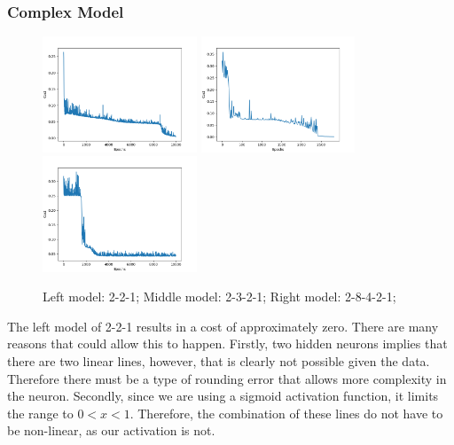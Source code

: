 \subsubsection{Complex Model}
\label{rescomp}
\begin{figure}[H]

\includegraphics[width=4.6cm]{images/parameters/complex/line-.png}
\includegraphics[width=4.6cm]{images/parameters/complex/line.png}
\includegraphics[width=4.6cm]{images/parameters/complex/line+.png}

\caption{Left model: 2-2-1; Middle model: 2-3-2-1; Right model: 2-8-4-2-1;}
\end{figure}

The left model of 2-2-1 results in a cost of approximately zero. There are many reasons that could allow this to happen. Firstly, two hidden neurons implies that there are two linear lines, however, that is clearly not possible given the data. Therefore there must be a type of rounding error that allows more complexity in the neuron. Secondly, since we are using a sigmoid activation function, it limits the range to $0<x<1$. Therefore, the combination of these lines do not have to be non-linear, as our activation is not.